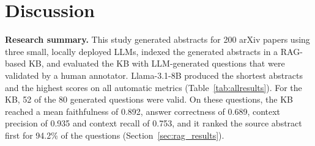 \documentclass[bdcc,article,submit,pdftex,moreauthors]{Definitions/mdpi}
\newif\ifshowchanges
\newcommand{\commentRed}[1]{\textcolor{red}{#1}}
\newcommand{\commentVP}[1]{\textcolor{orange}{\textbf{VP:} #1}}
\newcommand{\commentGN}[1]{\textcolor{olive}{\textbf{GC:} #1}}
\newif\ifshowchanges
\begin{document}
\section{Discussion}



\textbf{Research summary.} This study generated abstracts for 200 arXiv papers using three small, locally deployed LLMs, indexed the generated abstracts in a RAG-based KB, and evaluated the KB with LLM-generated questions that were validated by a human annotator. Llama-3.1-8B produced the shortest abstracts and the highest scores on all automatic metrics (Table~\ref{tab:allresults}). For the KB, 52 of the 80 generated questions were valid. On these questions, the KB reached a mean faithfulness of 0.892, answer correctness of 0.689, context precision of 0.935 and context recall of 0.753, and it ranked the source abstract first for 94.2\% of the questions (Section~\ref{sec:rag_results}).


\end{document}
